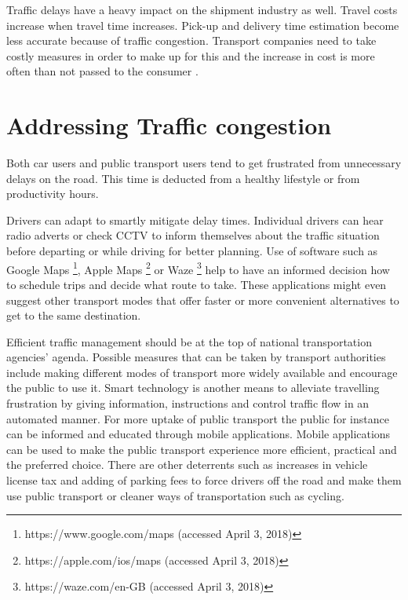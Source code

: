 \documentclass[12pt, a4paper]{report}
\theoremstyle{definition}
\theoremstyle{definition}%
\theoremstyle{definition}%
\theoremstyle{definition}%
\theoremstyle{definition}%
\theoremstyle{definition}%
\begin{document}
Traffic delays have a heavy impact on the shipment industry as well. Travel costs increase when travel time increases.  Pick-up and delivery time estimation become less accurate because of traffic congestion. Transport companies need to take costly measures in order to make up for this and the increase in cost is more often than not passed to the consumer  \cite{Schrank.2015, CambridgeSystematicsInc.2005}.

\section{Addressing Traffic congestion} \label{section:introduction:addressing_traffic_congestion}

Both car users and public transport users tend to get frustrated from unnecessary delays on the road. This time is deducted from a healthy lifestyle or from productivity hours. 

Drivers can adapt to smartly mitigate delay times. Individual drivers can hear radio adverts or check CCTV to inform themselves about the traffic situation before departing or while driving for better planning. Use of software such as Google Maps  \footnote{https://www.google.com/maps (accessed April 3, 2018)}, Apple Maps \footnote{https://apple.com/ios/maps (accessed April 3, 2018)} or Waze \footnote{https://waze.com/en-GB (accessed April 3, 2018)} help to have an informed decision how to schedule trips and decide what route to take.  These applications might even suggest other transport modes that offer faster or more convenient alternatives to get to the same destination.

Efficient traffic management should be at the top of national transportation agencies' agenda. Possible measures that can be taken by transport authorities include making different modes of transport more widely available and encourage the public to use it. Smart technology is another means to alleviate travelling frustration by giving information, instructions and control traffic flow in an automated manner. For more uptake of public transport the public for instance can be informed and educated through mobile applications.  Mobile applications can be used to make the public transport experience more efficient, practical and the preferred choice. There are other deterrents such as increases in vehicle license tax and adding of parking fees to force drivers off the road and make them use public transport or cleaner ways of transportation such as cycling.
\end{document}
